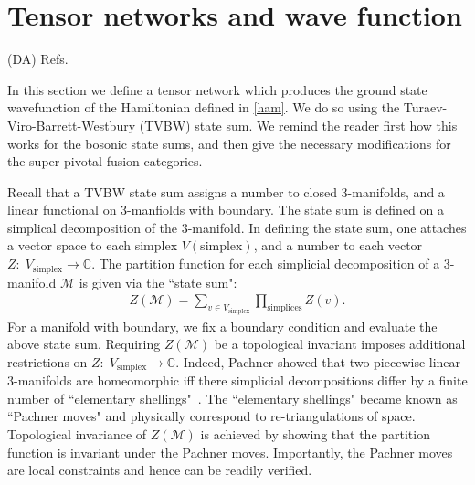 \documentclass[12pt,a4paper]{article}
\newcounter{arrow}
\newcommand{\ra}{\rightarrow}
\newcommand{\cc}{\mathbb{C}}
\newcommand{\mcm}{\mathcal{M}}
\newcommand{\dave}[1]{{\color{ao(english)}\footnotesize{(DA) #1}}}
\begin{document}



\section{Tensor networks and wave function}
\dave{Refs.}
\cite{Turaev2010}

In this section we define a tensor network which produces the ground state wavefunction of the Hamiltonian defined in \eqref{ham}.
We do so using the Turaev-Viro-Barrett-Westbury (TVBW) state sum\cite{Turaev1992,Barrett1996}.
We remind the reader first how this works for the bosonic state sums, 
and then give the necessary modifications for the super pivotal fusion categories.



Recall that a TVBW state sum assigns a number to closed 3-manifolds, 
and a linear functional on 3-manfiolds with boundary. 
The state sum is defined on a simplical decomposition of the 3-manifold.
In defining the state sum, one attaches a vector space to each simplex $V(\text{simplex})$, and a number to each vector $Z: \; V_\text{simplex} \ra \cc$.
The partition function for each simplicial decomposition of a 3-manifold $\mcm$ is given via the ``state sum": 
\begin{align}
Z(\mcm) = \sum_{v \in V_\text{simplex} } \prod_{\text{simplices}} Z(v).
\end{align} 
For a manifold with boundary, we fix a boundary condition and evaluate the above state sum. 
Requiring $Z(\mcm)$ be a topological invariant imposes additional restrictions on $Z: \; V_\text{simplex} \ra \cc$. 
Indeed, Pachner showed that two piecewise linear 3-manifolds are homeomorphic 
iff there simplicial decompositions differ by a finite number of ``elementary shellings"~\cite{Pachner1991}.
The ``elementary shellings" became known as ``Pachner moves" and physically correspond to re-triangulations of space.
Topological invariance of $Z(\mcm)$ is achieved by showing that the partition function is invariant under the Pachner moves.
Importantly, the Pachner moves are local constraints and hence can be readily verified.
\end{document}
